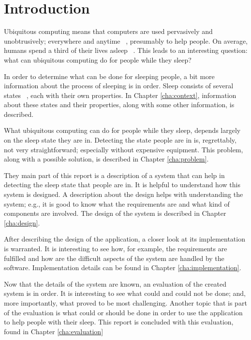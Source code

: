 \chapter{Introduction} %
\label{cha:introduction}
Ubiquitous computing means that computers are used pervasively and unobtrusively; everywhere and anytime ~\cite{Weiser:1993:UC:618984.619973}, presumably to help people. On average, humans spend a third of their lives asleep ~\cite{Lauderdale:2006:Am-J-Epidemiol:16740591}. This leads to an interesting question: what can ubiquitous computing do for people while they sleep? 

In order to determine what can be done for sleeping people, a bit more information about the process of sleeping is in order. Sleep consists of several states ~\cite{Silber:2007fk}, each with their own properties. In Chapter \ref{cha:context}, information about these states and their properties, along with some other information, is described.

What ubiquitous computing can do for people while they sleep, depends largely on the sleep state they are in. Detecting the state people are in is, regrettably, not very straightforward; especially without expensive equipment. This problem, along with a possible solution, is described in Chapter \ref{cha:problem}.

They main part of this report is a description of a system that can help in detecting the sleep state that people are in. It is helpful to understand how this system is designed. A description about the design helps with understanding the system; e.g., it is good to know what the requirements are and what kind of components are involved. The design of the system is described in Chapter \ref{cha:design}.

After describing the design of the application, a closer look at its implementation is warranted. It is interesting to see how, for example, the requirements are fulfilled and how are the difficult aspects of the system are handled by the software. Implementation details can be found in Chapter \ref{cha:implementation}.

Now that the details of the system are known, an evaluation of the created system is in order. It is interesting to see what could and could not be done; and, more importantly, what proved to be most challenging. Another topic that is part of the evaluation is what could or should be done in order to use the application to help people with their sleep. This report is concluded with this evaluation, found in Chapter \ref{cha:evaluation}
